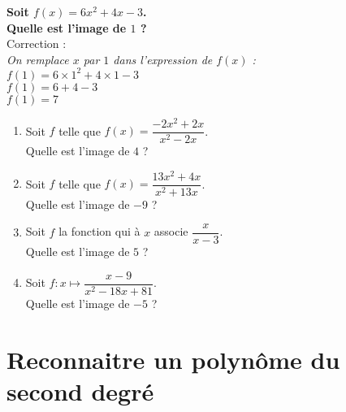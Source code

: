 \documentclass[11pt]{article}
\begin{document}
\begin{exercice}
\textbf{Soit $f(x)=6x^2+4x-3$. \\ Quelle est l'image de $1$ ?}
\\
Correction :\\
\textit{On remplace $x$ par $1$ dans l'expression de $f(x)$ : \\
$f(1)=6 \times 1^2 + 4 \times 1 - 3$ \\
$f(1)=6+4-3$ \\
$f(1)=7$ }
\end{exercice}

\begin{exercice}

\end{exercice}

\begin{exercice}
  \begin{multicols}{2}
    \begin{enumerate}[itemsep=1.5em]
    \item Soit $f$ telle que $f(x)=\dfrac{-2x^2+2x}{x^2-2x}$. \\
      Quelle est l'image de $4$ ?\\ \dtf
    \item Soit $f$ telle que $f(x)=\dfrac{13x^2+4x}{x^2+13x}$. \\
      Quelle est l'image de $-9$ ?\\ \dtf
    \item Soit $f$ la fonction qui à $x$ associe $\dfrac{x}{x-3}$. \\
      Quelle est l'image de $5$ ?\\ \dtf
    \item Soit $f: x \longmapsto \dfrac{x-9}{x^2-18x+81}$. \\
      Quelle est l'image de $-5$ ?\\ \dtf
    \end{enumerate}
  \end{multicols}
\end{exercice}

\section{Reconnaitre un polynôme du second degré}
\begin{exercice}

\end{exercice}
\end{document}
